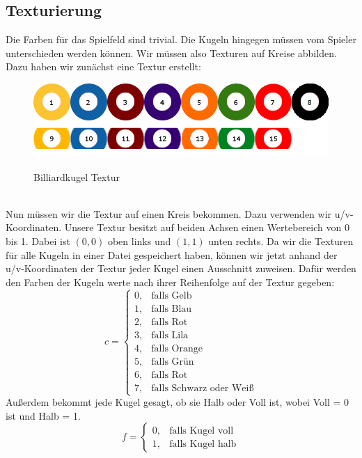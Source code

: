 \subsection{Texturierung}
	Die Farben für das Spielfeld sind trivial. 
	Die Kugeln hingegen müssen vom Spieler unterschieden werden können. 
	Wir müssen also Texturen auf Kreise abbilden. 
	Dazu haben wir zunächst eine Textur erstellt: \\
	\begin{figure}[h]
		\caption{Billiardkugel Textur}
			\includegraphics[width=\textwidth]{bilder/Balls.png} \\
	\end{figure} \\
	Nun müssen wir die Textur auf einen Kreis bekommen. 
	Dazu verwenden wir u/v-Koordinaten. 
	Unsere Textur besitzt auf beiden Achsen einen Wertebereich von 0 bis 1. 
	Dabei ist $(0,0)$  oben links und $(1,1)$  unten rechts. 
	Da wir die Texturen für alle Kugeln in einer Datei gespeichert haben, können wir jetzt anhand der u/v-Koordinaten der Textur jeder Kugel einen Ausschnitt zuweisen.
	Dafür werden den Farben der Kugeln werte nach ihrer Reihenfolge auf der Textur gegeben: 
	\begin{equation}\label{eq:color}
	c = 
	\begin{cases}
		0, & \text{falls Gelb} \\
		1, & \text{falls Blau} \\
		2, & \text{falls Rot} \\
		3, & \text{falls Lila} \\
		4, & \text{falls Orange} \\
		5, & \text{falls Grün} \\
		6, & \text{falls Rot} \\
		7, & \text{falls Schwarz oder Weiß}
	\end{cases}
	\end{equation} 
	Außerdem bekommt jede Kugel gesagt, ob sie Halb oder Voll ist, wobei Voll = 0 ist und Halb = 1.  \\
	\begin{equation} \label{eq:full}
	f = 
	\begin{cases}
		0, & \text{falls Kugel voll} \\
		1, & \text{falls Kugel halb}	
	\end{cases}
	\end{equation}\\
